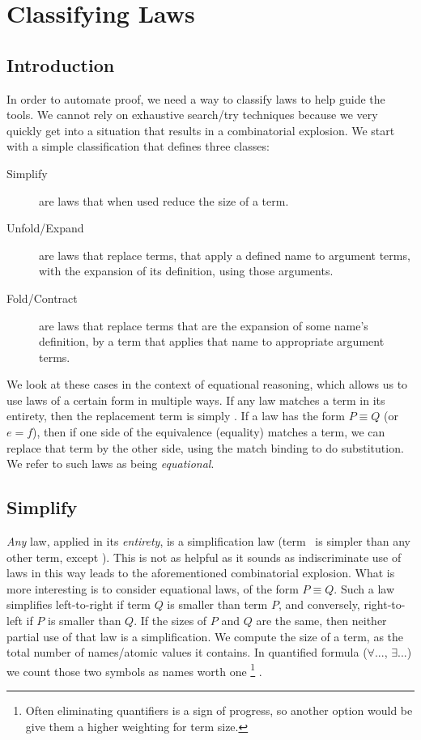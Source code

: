 \chapter{Classifying Laws}

\section{Introduction}

In order to automate proof, 
we need a way to classify laws to help guide the tools.
We cannot rely on exhaustive search/try techniques
because we very quickly get into a situation that results in a 
combinatorial explosion.
We start with a simple classification that defines three classes:

\begin{description}
    \item[Simplify]
      are laws that when used reduce the size of a term.
    \item[Unfold/Expand]
      are laws that replace terms,
      that apply a defined name to argument terms,
      with the expansion of its definition,
      using those arguments.
    \item[Fold/Contract]
      are laws that replace terms
      that are the expansion of some name's definition,
      by a term that applies that name to appropriate argument terms.
\end{description}

We look at these cases in the context of equational reasoning,
which allows us to use laws of a certain form in multiple ways.
If any law matches a term in its entirety, 
then the replacement term is simply \true.
If a law has the form $P \equiv Q$ (or $e = f$),
then if one side of the equivalence (equality) matches a term,
we can replace that term by the other side, 
using the match binding to do substitution.
We refer to such laws as being \emph{equational}.

\section{Simplify}

\emph{Any} law, applied in its \emph{entirety}, is a simplification law
(term \true\ is simpler than any other term, except \false).
This is not as helpful as it sounds as indiscriminate use of laws
in this way leads to the aforementioned combinatorial explosion.
What is more interesting is to consider equational laws,
of the form $P \equiv Q$.
Such a law simplifies left-to-right if term $Q$ is smaller than term $P$,
and conversely, right-to-left if $P$ is smaller than $Q$.
If the sizes of $P$ and $Q$ are the same,
then neither partial use of that law is a simplification.
We compute the size of a term,
as the total number of names/atomic values it contains.
In quantified formula ($\forall ...$, $\exists ...$) 
we count those two symbols as names worth one%
\footnote{
Often eliminating quantifiers is a sign of progress, 
so another option would be give them a higher weighting for term size.
}%
.

